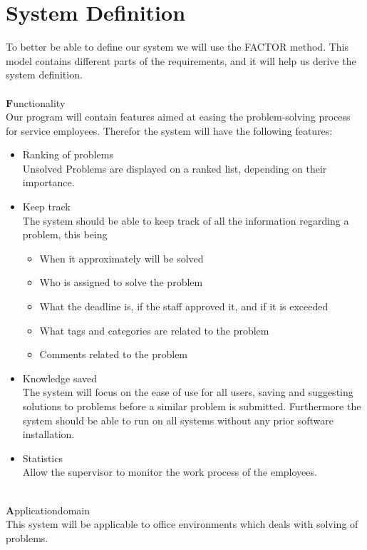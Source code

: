 \section{System Definition}
\label{sec:factor}
\label{sec:systemdefinition}
To better be able to define our system we will use the FACTOR method\cite[p. 39]{roedeaalborg}. This model contains different parts of the requirements, and it will help us derive the system definition.  \\
\ \\
{\Large \textbf{F}}unctionality \\
Our program will contain features aimed at easing the problem-solving process for service employees. Therefor the system will have the following features:
\begin{itemize}
\item Ranking of problems \\
Unsolved Problems are displayed on a ranked list, depending on their importance.
\item Keep track \\
The system should be able to keep track of all the information regarding a problem, this being
\begin{itemize}
	\item When it approximately will be solved
	\item Who is assigned to solve the problem
	\item What the deadline is, if the staff approved it, and if it is exceeded
	\item What tags and categories are related to the problem 
	\item Comments related to the problem
\end{itemize}
\item Knowledge saved \\
The system will focus on the ease of use for all users, saving and suggesting solutions to problems before a similar problem is submitted. Furthermore the system should be able to run on all systems without any prior software installation.
\item Statistics \\
Allow the supervisor to monitor the work process of the employees.
\end{itemize}
\ \\
{\Large \textbf{A}}pplicationdomain \\
This system will be applicable to office environments which deals with solving of problems.\\
